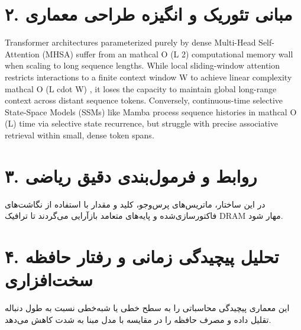 \documentclass[12pt,a4paper]{article}
\begin{document}
\section*{۲. مبانی تئوریک و انگیزه طراحی معماری}
Transformer architectures parameterized purely by dense Multi-Head Self-Attention (MHSA) suffer from an mathcal O (L 2) computational memory wall when scaling to long sequence lengths. While local sliding-window attention restricts interactions to a finite context window W to achieve linear complexity mathcal O (L cdot W) , it loses the capacity to maintain global long-range context across distant sequence tokens. Conversely, continuous-time selective State-Space Models (SSMs) like Mamba process sequence histories in mathcal O (L) time via selective state recurrence, but struggle with precise associative retrieval within small, dense token spans.

\section*{۳. روابط و فرمول‌بندی دقیق ریاضی}
در این ساختار، ماتریس‌های پرس‌وجو، کلید و مقدار با استفاده از نگاشت‌های فاکتورسازی‌شده و پایه‌های متعامد بازآرایی می‌گردند تا ترافیک DRAM مهار شود.

\section*{۴. تحلیل پیچیدگی زمانی و رفتار حافظه سخت‌افزاری}
این معماری پیچیدگی محاسباتی را به سطح خطی یا شبه‌خطی نسبت به طول دنباله تقلیل داده و مصرف حافظه را در مقایسه با مدل مبنا به شدت کاهش می‌دهد.
\end{document}
